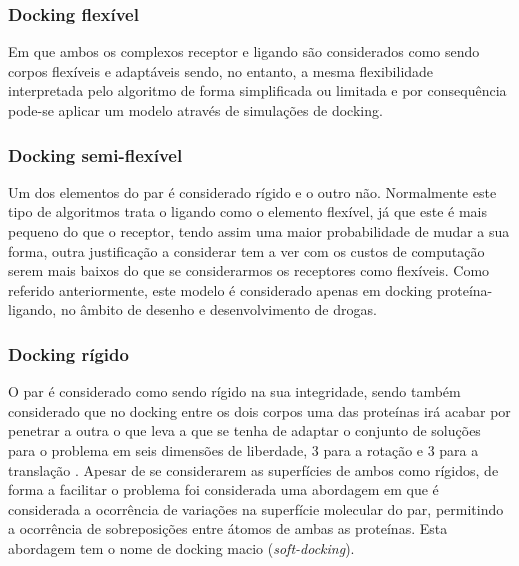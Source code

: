 

	\subsubsection{Docking flexível} Em que ambos os complexos receptor e ligando são considerados como sendo corpos flexíveis e adaptáveis sendo, no entanto, a mesma flexibilidade interpretada pelo algoritmo de forma simplificada ou limitada e por consequência pode-se aplicar um modelo através de simulações de docking.

	\subsubsection{Docking semi-flexível} Um dos elementos do par é considerado rígido e o outro não. Normalmente este tipo de algoritmos trata o ligando como o elemento flexível, já que este é mais pequeno do que o receptor, tendo assim uma maior probabilidade de mudar a sua forma, outra justificação a considerar tem a ver com os custos de computação serem mais baixos do que se considerarmos os receptores como flexíveis. Como referido anteriormente, este modelo é considerado apenas em docking proteína-ligando, no âmbito de desenho e desenvolvimento de drogas.

	\subsubsection{Docking rígido} 
	\label{rigidDocking}
	O par é considerado como sendo rígido na sua integridade, sendo também considerado que no docking entre os dois corpos uma das proteínas irá acabar por penetrar a outra o que leva a que se tenha de adaptar o conjunto de soluções para o problema em seis 		dimensões de liberdade, 3 para a rotação e 3 para a translação \cite{vakser2014protein}. Apesar de se considerarem as superfícies de ambos como rígidos, de forma a facilitar o problema foi considerada uma abordagem em que é considerada a ocorrência de variações na superfície molecular do par, permitindo a ocorrência de sobreposições entre átomos de ambas as proteínas. Esta abordagem tem o nome de docking macio (\textit{soft-docking}).

